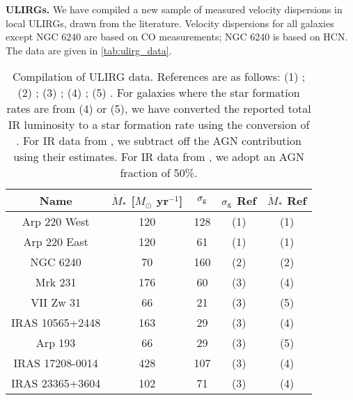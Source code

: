 \documentclass[useAMS,usenatbib]{mn2e}
\begin{document}
\begin{appendix}
\textbf{ULIRGs.} We have compiled a new sample of measured velocity dispersions in local ULIRGs, drawn from the literature. Velocity dispersions for all galaxies except NGC 6240 are based on CO measurements; NGC 6240 is based on HCN. The data are given in \autoref{tab:ulirg_data}.

\begin{table}
\begin{tabular}{c@{$\quad$}cccc}
\hline
Name & $\dot{M}_*$ [$M_\odot$ yr$^{-1}$] & $\sigma_{\rm g}$ & $\sigma_{\rm g}$ Ref & $\dot{M}_*$ Ref \\
\hline
Arp 220 West & 120 & 128 & (1) & (1) \\
Arp 220 East & 120 & 61 & (1) & (1) \\
NGC 6240 & 70 & 160 & (2) & (2) \\
Mrk 231 & 176 & 60 & (3) & (4) \\
VII Zw 31 & 66 & 21 & (3) & (5) \\
IRAS 10565+2448 & 163 & 29 & (3) & (4) \\
Arp 193 & 66 & 29 & (3) & (5) \\
IRAS 17208-0014 & 428 & 107 & (3) & (4) \\
IRAS 23365+3604 & 102 & 71 & (3) & (4) \\
\hline
\end{tabular}
\caption{
\label{tab:ulirg_data}
Compilation of ULIRG data. References are as follows: (1) \citet{scoville17a}; (2) \citet{scoville15a}; (3) \citet{downes98a}; (4) \citet{veilleux09a}; (5) \citet{sanders03a}. For galaxies where the star formation rates are from (4) or (5), we have converted the reported total IR luminosity to a star formation rate using the conversion of \citet{kennicutt12a}. For IR data from \citet{veilleux09a}, we subtract off the AGN contribution using their estimates. For IR data from \citet{sanders03a}, we adopt an AGN fraction of 50\%.
}
\end{table}

\end{appendix}
\end{document}
